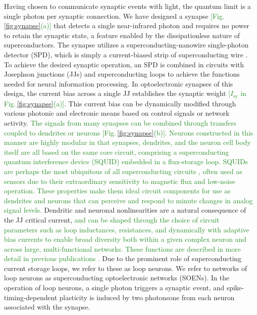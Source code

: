 \documentclass[twocolumn]{article}
\begin{document}
Having chosen to communicate synaptic events with light, the quantum limit is a single photon per synaptic connection. We have designed a synapse \cite{sh2018,sh2020} \textcolor{ForestGreen}{[Fig.\,\ref{fig:synapse}(a)]} that detects a single near-infrared photon and requires no power to retain the synaptic state, a feature enabled by the dissipationless nature of superconductors. The synapse utilizes a superconducting-nanowire single-photon detector (SPD), which is simply a current-biased strip of superconducting wire \cite{mave2013}. To achieve the desired synaptic operation, an SPD is combined in circuits with Josephson junctions (JJs) and superconducting loops to achieve the functions needed for neural information processing. In optoelectronic synapses of this design, the current bias across a single JJ establishes the synaptic weight \textcolor{ForestGreen}{[$I_{\mathrm{sy}}$ in Fig.\,\ref{fig:synapse}(a)]}. This current bias can be dynamically modified through various photonic and electronic means based on control signals or network activity. \textcolor{ForestGreen}{The signals from many synapses can be combined through transfers coupled to dendrites or neurons [Fig.\,\ref{fig:synapse}(b)]. Neurons constructed in this manner are highly modular in that synapses, dendrites, and the neuron cell body itself are all based on the same core circuit, comprising a superconducting quantum interference device (SQUID) embedded in a flux-storage loop. SQUIDs are perhaps the most ubiquitous of all superconducting circuits \cite{vatu1998,ka1999}, often used as sensors due to their extraordinary sensitivity to magnetic flux and low-noise operation. These properties make them ideal circuit components for use as dendrites and neurons that can perceive and respond to minute changes in analog signal levels.} Dendritic and neuronal nonlinearities are a natural consequence of the JJ critical current, \textcolor{ForestGreen}{and can be shaped through the choice of circuit parameters such as loop inductances, resistances, and dynamically with adaptive bias currents to enable broad diversity both within a given complex neuron and across large, multi-functional networks. These functions are described in more detail in previous publications \cite{sh2018,sh2019,sh2020}.} Due to the prominent role of superconducting current storage loops, we refer to these as loop neurons. We refer to networks of loop neurons as superconducting optoelectronic networks (SOENs). In the operation of loop neurons, a single photon triggers a synaptic event, and spike-timing-dependent plasticity is induced by two photons\textemdash one from each neuron associated with the synapse.
\end{document}
